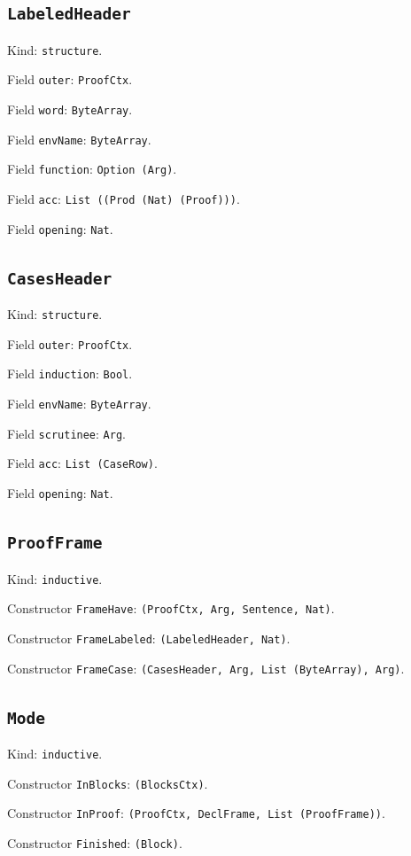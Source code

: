 \documentclass[11pt]{article}
\begin{document}
\subsection*{\texttt{LabeledHeader}}
\noindent Kind: \texttt{structure}.\par
\noindent Field \texttt{outer}: \texttt{ProofCtx}.\par
\noindent Field \texttt{word}: \texttt{ByteArray}.\par
\noindent Field \texttt{envName}: \texttt{ByteArray}.\par
\noindent Field \texttt{function}: \texttt{Option (Arg)}.\par
\noindent Field \texttt{acc}: \texttt{List ((Prod (Nat) (Proof)))}.\par
\noindent Field \texttt{opening}: \texttt{Nat}.\par
\subsection*{\texttt{CasesHeader}}
\noindent Kind: \texttt{structure}.\par
\noindent Field \texttt{outer}: \texttt{ProofCtx}.\par
\noindent Field \texttt{induction}: \texttt{Bool}.\par
\noindent Field \texttt{envName}: \texttt{ByteArray}.\par
\noindent Field \texttt{scrutinee}: \texttt{Arg}.\par
\noindent Field \texttt{acc}: \texttt{List (CaseRow)}.\par
\noindent Field \texttt{opening}: \texttt{Nat}.\par
\subsection*{\texttt{ProofFrame}}
\noindent Kind: \texttt{inductive}.\par
\noindent Constructor \texttt{FrameHave}: \texttt{(ProofCtx, Arg, Sentence, Nat)}.\par
\noindent Constructor \texttt{FrameLabeled}: \texttt{(LabeledHeader, Nat)}.\par
\noindent Constructor \texttt{FrameCase}: \texttt{(CasesHeader, Arg, List (ByteArray), Arg)}.\par
\subsection*{\texttt{Mode}}
\noindent Kind: \texttt{inductive}.\par
\noindent Constructor \texttt{InBlocks}: \texttt{(BlocksCtx)}.\par
\noindent Constructor \texttt{InProof}: \texttt{(ProofCtx, DeclFrame, List (ProofFrame))}.\par
\noindent Constructor \texttt{Finished}: \texttt{(Block)}.\par
\end{document}
